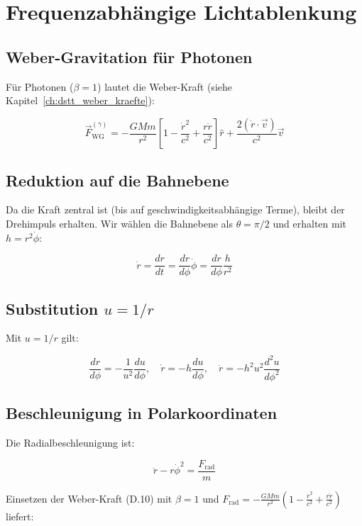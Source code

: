 \section{Frequenzabhängige Lichtablenkung}
\label{app:herleitungen_lichtablenkung}

\subsection{Weber-Gravitation für Photonen}
\label{sub:herleitungen_licht_weber}

Für Photonen (\(\beta = 1\)) lautet die Weber-Kraft (siehe Kapitel~\ref{ch:dstt_weber_kraefte}):

\[
\vec{F}_{\text{WG}}^{(\gamma)} = -\frac{GMm}{r^2} \left[ 1 - \frac{\dot{r}^2}{c^2} + \frac{r\ddot{r}}{c^2} \right] \hat{r} + \frac{2(\dot{r} \cdot \vec{v})}{c^2} \vec{v} \tag{D.10}
\]

\subsection{Reduktion auf die Bahnebene}
\label{sub:herleitungen_licht_bahn}

Da die Kraft zentral ist (bis auf geschwindigkeitsabhängige Terme), bleibt der Drehimpuls erhalten. Wir wählen die Bahnebene als \(\theta = \pi/2\) und erhalten mit \(h = r^2\dot{\phi}\):

\[
\dot{r} = \frac{dr}{dt} = \frac{dr}{d\phi} \dot{\phi} = \frac{dr}{d\phi} \frac{h}{r^2}
\]

\subsection{Substitution \(u = 1/r\)}
\label{sub:herleitungen_licht_subst}

Mit \(u = 1/r\) gilt:

\[
\frac{dr}{d\phi} = -\frac{1}{u^2} \frac{du}{d\phi}, \quad
\dot{r} = -h \frac{du}{d\phi}, \quad
\ddot{r} = -h^2 u^2 \frac{d^2u}{d\phi^2}
\]

\subsection{Beschleunigung in Polarkoordinaten}
\label{sub:herleitungen_licht_beschl}

Die Radialbeschleunigung ist:

\[
\ddot{r} - r\dot{\phi}^2 = \frac{F_{\text{rad}}}{m}
\]

Einsetzen der Weber-Kraft (D.10) mit \(\beta = 1\) und \(F_{\text{rad}} = -\frac{GMm}{r^2}\left(1 - \frac{\dot{r}^2}{c^2} + \frac{r\ddot{r}}{c^2}\right)\) liefert:

